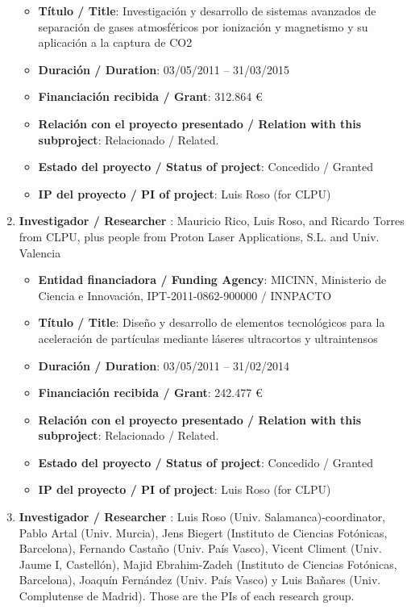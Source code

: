 \begin{enumerate}
\begin{itemize}
	\item {\bf Título / Title}: Investigaci\'on y desarrollo de sistemas avanzados de separaci\'on de gases atmosf\'ericos por ionizaci\'on y magnetismo y su aplicaci\'on a la captura de CO2
	\item {\bf Duración / Duration}: 03/05/2011 -- 31/03/2015
	\item {\bf Financiación recibida / Grant}: 312.864 \euro 
	\item {\bf Relación con el proyecto presentado / Relation with this subproject}: Relacionado / Related. 
	\item {\bf Estado del proyecto / Status of project}: Concedido / Granted
	\item {\bf IP del proyecto / PI of project}: Luis Roso (for CLPU)
\end{itemize}
\item {\bf Investigador / Researcher }: Mauricio Rico, Luis Roso, and Ricardo Torres from CLPU, plus people from Proton Laser Applications, S.L. and  Univ. Valencia
\begin{itemize}
	\item {\bf Entidad financiadora / Funding Agency}: MICINN, Ministerio de Ciencia e Innovaci\'on, IPT-2011-0862-900000     / INNPACTO
	\item {\bf Título / Title}: Dise\~no y desarrollo de elementos tecnol\'ogicos para la aceleraci\'on de part\'iculas mediante l\'aseres ultracortos y ultraintensos
	\item {\bf Duración / Duration}: 03/05/2011 -- 31/02/2014
	\item {\bf Financiación recibida / Grant}: 242.477 \euro 
	\item {\bf Relación con el proyecto presentado / Relation with this subproject}: Relacionado / Related. 
	\item {\bf Estado del proyecto / Status of project}: Concedido / Granted
	\item {\bf IP del proyecto / PI of project}: Luis Roso (for CLPU)
\end{itemize}
\item {\bf Investigador / Researcher }: Luis Roso (Univ. Salamanca)-coordinator, Pablo Artal (Univ. Murcia), Jens Biegert (Instituto de Ciencias Fot\'onicas, Barcelona), Fernando Castaño (Univ. Pa\'is Vasco), Vicent Climent (Univ. Jaume I, Castell\'on), Majid Ebrahim-Zadeh (Instituto de Ciencias Fot\'onicas, Barcelona), Joaqu\'in Fern\'andez (Univ. Pa\'is Vasco) y Luis Bañares (Univ. Complutense de Madrid). Those are the PIs of each research group.


\end{enumerate}
